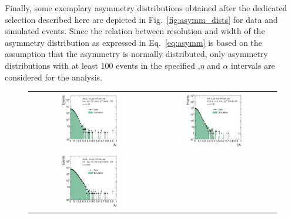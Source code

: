 Finally, some exemplary asymmetry distributions obtained after the dedicated selection described here are depicted in Fig.~\ref{fig:asymm_dists} for data and simulated events. Since the relation between resolution and width of the asymmetry distribution as expressed in Eq.~\ref{eq:asymm} is based on the assumption that the asymmetry is normally distributed, only asymmetry distributions with at least 100 events in the specified \ptave,$\eta$ and $\alpha$ intervals are considered for the analysis.
\begin{figure}[!tp]
  \centering
  \begin{tabular}{cc}
                \includegraphics[width=0.49\textwidth]{figures/AsymmHistos_Eta0_pt4_alpha1_final_nominal_v4.pdf} &
                \includegraphics[width=0.49\textwidth]{figures/AsymmHistos_Eta0_pt9_alpha1_final_nominal_v4.pdf} \\ 
                \includegraphics[width=0.49\textwidth]{figures/AsymmHistos_Eta0_pt4_alpha5_final_nominal_v4.pdf} &

\end{tabular}
\end{figure}
